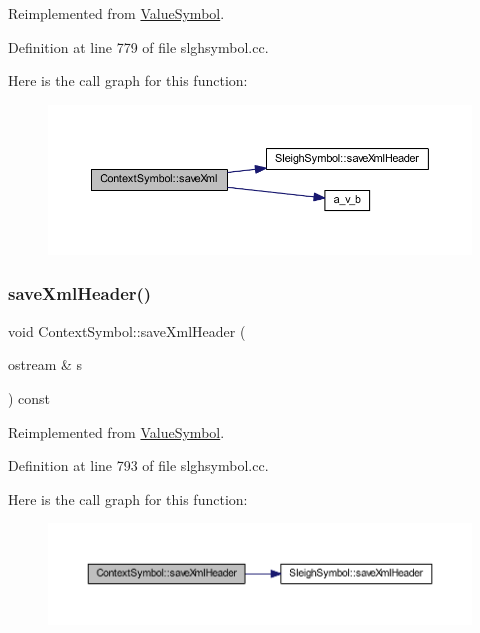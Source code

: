 Reimplemented from \mbox{\hyperlink{class_value_symbol_aa7b4012d522c5864aea52486b0d47978}{Value\+Symbol}}.



Definition at line 779 of file slghsymbol.\+cc.

Here is the call graph for this function\+:
\nopagebreak
\begin{figure}[H]
\begin{center}
\leavevmode
\includegraphics[width=350pt]{class_context_symbol_ad8c4f39c37d11ed5f0fd7bf4eb59dca6_cgraph}
\end{center}
\end{figure}
\mbox{\label{class_context_symbol_a4a9e76b855af1a02bc7ab142d041db87}} 
\subsubsection{\texorpdfstring{saveXmlHeader()}{saveXmlHeader()}}
{\footnotesize\ttfamily void Context\+Symbol\+::save\+Xml\+Header (\begin{DoxyParamCaption}\item[{ostream \&}]{s }\end{DoxyParamCaption}) const\hspace{0.3cm}{\ttfamily [virtual]}}



Reimplemented from \mbox{\hyperlink{class_value_symbol_a7b1c84bd9d7e84f9272d448d10c31200}{Value\+Symbol}}.



Definition at line 793 of file slghsymbol.\+cc.

Here is the call graph for this function\+:
\nopagebreak
\begin{figure}[H]
\begin{center}
\leavevmode
\includegraphics[width=350pt]{class_context_symbol_a4a9e76b855af1a02bc7ab142d041db87_cgraph}
\end{center}
\end{figure}


